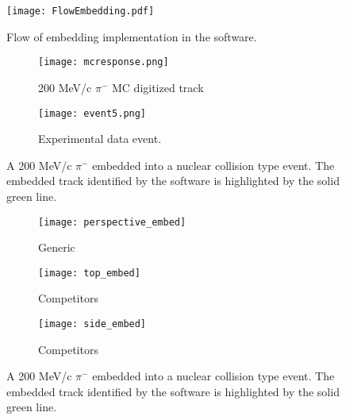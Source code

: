 

\begin{figure}[H]
\centering
\texttt{[image: FlowEmbedding.pdf]}
\caption{Flow of embedding implementation in the software.}
\label{fig:flow}
\end{figure}


\begin{figure}[!htb]
    \centering
    \begin{subfigure}[t]{0.49\textwidth}
        \centering
        \texttt{[image: mcresponse.png]}
        \caption{200 MeV/c $\pi^-$ MC digitized track} \label{fig:mcevent}
    \end{subfigure}
    \hfill
    \begin{subfigure}[t]{.49\textwidth}
        \centering
        \texttt{[image: event5.png]} 
        \caption{Experimental data event.} \label{fig:dataevent}
    \end{subfigure}
    \caption{A 200 MeV/c $\pi^-$ embedded into a nuclear collision type event. The embedded track identified by the software is highlighted by the solid green line. }

\label{fig:embedtrack}
\end{figure}



\begin{figure}[!htb]
    \centering
    \begin{subfigure}[t]{0.49\textwidth}
        \centering
        \texttt{[image: perspective\_embed]}
        \caption{Generic} \label{fig:persEmbed}
    \end{subfigure}
    \hfill
    \begin{subfigure}[t]{.3\textwidth}
        \centering
        \texttt{[image: top\_embed]} 
        \caption{Competitors} \label{fig:topEmbed}
    \end{subfigure}
     \hfill
    \begin{subfigure}[t]{\textwidth}
        \centering
        \texttt{[image: side\_embed]} 
        \caption{Competitors} \label{fig:sideEmbed}
    \end{subfigure}
    \caption{A 200 MeV/c $\pi^-$ embedded into a nuclear collision type event. The embedded track identified by the software is highlighted by the solid green line. }

\label{fig:embedtrack}
\end{figure}


